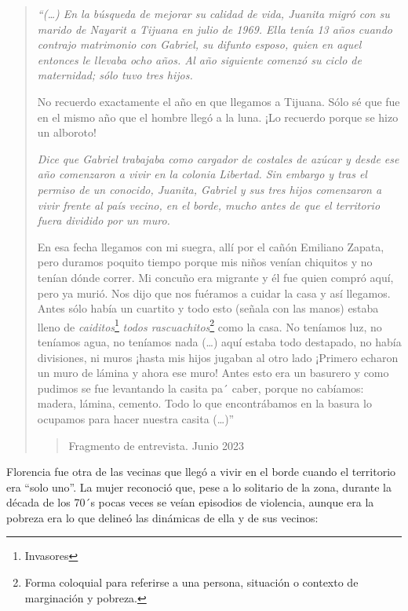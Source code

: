 \documentclass[
  spanish,
  11pt,
  a4paper,
]{scrbook}
\begin{document}
\begin{quote}
\emph{``(\ldots) En la búsqueda de mejorar su calidad de vida, Juanita
migró con su marido de Nayarit a Tijuana en julio de 1969. Ella tenía 13
años cuando contrajo matrimonio con Gabriel, su difunto esposo, quien en
aquel entonces le llevaba ocho años. Al año siguiente comenzó su ciclo
de maternidad; sólo tuvo tres hijos.}

No recuerdo exactamente el año en que llegamos a Tijuana. Sólo sé que
fue en el mismo año que el hombre llegó a la luna. ¡Lo recuerdo porque
se hizo un alboroto!

\emph{Dice que Gabriel trabajaba como cargador de costales de azúcar y
desde ese año comenzaron a vivir en la colonia Libertad. Sin embargo y
tras el permiso de un conocido, Juanita, Gabriel y sus tres hijos
comenzaron a vivir frente al país vecino, en el borde, mucho antes de
que el territorio fuera dividido por un muro.}

En esa fecha llegamos con mi suegra, allí por el cañón Emiliano Zapata,
pero duramos poquito tiempo porque mis niños venían chiquitos y no
tenían dónde correr. Mi concuño era migrante y él fue quien compró aquí,
pero ya murió. Nos dijo que nos fuéramos a cuidar la casa y así
llegamos. Antes sólo había un cuartito y todo esto (señala con las
manos) estaba lleno de \emph{caiditos}\footnote{Invasores} \emph{todos
rascuachitos}\footnote{Forma coloquial para referirse a una persona,
  situación o contexto de marginación y pobreza.} como la casa. No
teníamos luz, no teníamos agua, no teníamos nada (\ldots) aquí estaba
todo destapado, no había divisiones, ni muros ¡hasta mis hijos jugaban
al otro lado ¡Primero echaron un muro de lámina y ahora ese muro! Antes
esto era un basurero y como pudimos se fue levantando la casita pa´
caber, porque no cabíamos: madera, lámina, cemento. Todo lo que
encontrábamos en la basura lo ocupamos para hacer nuestra casita
(\ldots)''

\begin{quote}
Fragmento de entrevista. Junio 2023
\end{quote}
\end{quote}

Florencia fue otra de las vecinas que llegó a vivir en el borde cuando
el territorio era ``solo uno''. La mujer reconoció que, pese a lo
solitario de la zona, durante la década de los 70´s pocas veces se veían
episodios de violencia, aunque era la pobreza era lo que delineó las
dinámicas de ella y de sus vecinos:
\end{document}
